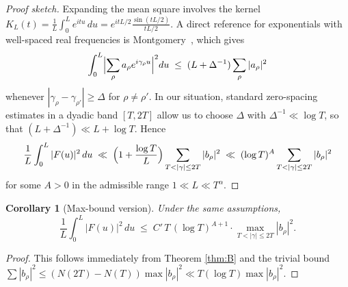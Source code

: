 \documentclass[11pt]{article}
\theoremstyle{plain}
\newtheorem{corollary}[theorem]{Corollary}
\theoremstyle{definition}
\begin{document}
\begin{proof}[Proof sketch]
Expanding the mean square involves the kernel $K_L(t) = \frac{1}{L}\int_0^L e^{itu}\,du = e^{itL/2}\frac{\sin(tL/2)}{tL/2}$. A direct reference for exponentials with well-spaced real frequencies is Montgomery~\cite[Theorem~1.3]{MontgomeryLNM227}, which gives
\[
  \int_0^L \Bigl|\sum_\rho a_\rho e^{i\gamma_\rho u}\Bigr|^2 du \;\le\; (L + \Delta^{-1}) \sum_\rho |a_\rho|^2
\]
whenever $|\gamma_\rho - \gamma_{\rho'}| \ge \Delta$ for $\rho \neq \rho'$. In our situation, standard zero-spacing estimates in a dyadic band $[T,2T]$ allow us to choose $\Delta$ with $\Delta^{-1} \ll \log T$, so that $(L + \Delta^{-1}) \ll L + \log T$. Hence
\[
  \frac{1}{L} \int_0^L |F(u)|^2 \, du \;\ll\; \Bigl(1 + \frac{\log T}{L}\Bigr) \sum_{T<|\gamma|\le 2T} |b_\rho|^2 \;\ll\; (\log T)^A \sum_{T<|\gamma|\le 2T} |b_\rho|^2
\]
for some $A>0$ in the admissible range $1 \ll L \ll T^\alpha$.
\end{proof}

\begin{corollary}[Max-bound version]
Under the same assumptions,
\[
  \frac{1}{L} \int_0^L |F(u)|^2 \, du
    \;\le\; C'\, T \,(\log T)^{A+1} \cdot \max_{T<|\gamma|\le 2T} |b_\rho|^2.
\]
\end{corollary}
\begin{proof}
This follows immediately from Theorem \ref{thm:B} and the trivial bound $\sum |b_\rho|^2 \le (N(2T)-N(T)) \max |b_\rho|^2 \ll T (\log T) \max |b_\rho|^2$.
\end{proof}
\end{document}
